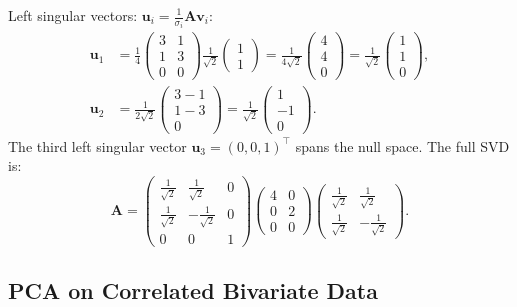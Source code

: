 \documentclass[conference]{IEEEtran}
\begin{document}
Left singular vectors: $\mathbf{u}_i = \frac{1}{\sigma_i}\mathbf{A}\mathbf{v}_i$:
\begin{align}
\mathbf{u}_1 &= \frac{1}{4}\begin{pmatrix}3&1\\1&3\\0&0\end{pmatrix}\frac{1}{\sqrt{2}}\begin{pmatrix}1\\1\end{pmatrix} = \frac{1}{4\sqrt{2}}\begin{pmatrix}4\\4\\0\end{pmatrix} = \frac{1}{\sqrt{2}}\begin{pmatrix}1\\1\\0\end{pmatrix}, \\
\mathbf{u}_2 &= \frac{1}{2\sqrt{2}}\begin{pmatrix}3-1\\1-3\\0\end{pmatrix} = \frac{1}{\sqrt{2}}\begin{pmatrix}1\\-1\\0\end{pmatrix}.
\end{align}
The third left singular vector $\mathbf{u}_3 = (0,0,1)^\top$ spans the null space. The full SVD is:
\begin{equation}
\mathbf{A} = \begin{pmatrix}\frac{1}{\sqrt{2}}&\frac{1}{\sqrt{2}}&0\\ \frac{1}{\sqrt{2}}&-\frac{1}{\sqrt{2}}&0\\ 0&0&1\end{pmatrix} \begin{pmatrix}4&0\\0&2\\0&0\end{pmatrix} \begin{pmatrix}\frac{1}{\sqrt{2}}&\frac{1}{\sqrt{2}}\\ \frac{1}{\sqrt{2}}&-\frac{1}{\sqrt{2}}\end{pmatrix}.
\end{equation}

\subsection{PCA on Correlated Bivariate Data}
\end{document}
